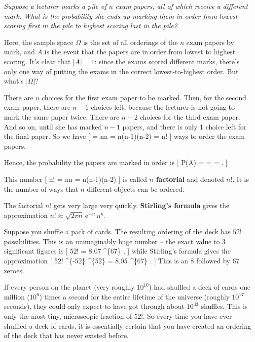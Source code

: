 \documentclass[
  letterpaper,
  DIV=11,
  numbers=noendperiod]{scrreprt}
\theoremstyle{remark}
\begin{document}
\emph{Suppose a lecturer marks a pile of \(n\) exam papers, all of which
receive a different mark. What is the probability she ends up marking
them in order from lowest scoring first in the pile to highest scoring
last in the pile?}

Here, the sample space \(\Omega\) is the set of all orderings of the
\(n\) exam papers by mark, and \(A\) is the event that the papers are in
order from lowest to highest scoring. It's clear that \(|A| = 1\): since
the exams scored different marks, there's only one way of putting the
exams in the correct lowest-to-highest order. But what's \(|\Omega|\)?

There are \(n\) choices for the first exam paper to be marked. Then, for
the second exam paper, there are \(n - 1\) choices left, because the
lecturer is not going to mark the same paper twice. There are \(n-2\)
choices for the third exam paper. And so on, until she has marked
\(n-1\) papers, and there is only 1 choice left for the final paper. So
we have {[} \textbar{}\Omega\textbar{} = \ff nn =
n(n-1)(n-2) = n! {]} ways to order the exam papers.

Hence, the probability the papers are marked in order is {[}
\mathbb P(A) =  =  =
 . {]}

This number {[} n! = \ff nn = n(n-1)(n-2) {]} is
called \textbf{\(n\) factorial} and denoted \(n!\). It is the number of
ways that \(n\) different objects can be ordered.

The factorial \(n!\) gets very large very quickly. \textbf{Stirling's
formula} gives the approximation
\(n! \approx \sqrt{2\pi n} \, \mathrm{e}^{-n} \, n^n\).

Suppose you shuffle a pack of cards. The resulting ordering of the deck
has \(52!\) possibilities. This is an unimaginably huge number -- the
exact value to 3 significant figures is {[} 52! = 8.07
\^{}\{67\} , {]} while Stirling's formula gives the
approximation {[} 52! \approx {}
\times {}\^{}\{-52\} \^{}\{52\} = 8.05
\^{}\{67\} . {]} This is an 8 followed by 67 zeroes.

If every person on the planet (very roughly \(10^{10}\)) had shuffled a
deck of cards one million (\(10^6\)) times a second for the entire
lifetime of the universe (roughly \(10^{17}\) seconds), they could only
expect to have got through about \(10^{33}\) shuffles. This is only the
most tiny, microscopic fraction of \(52!\). So every time you have ever
shuffled a deck of cards, it is essentially certain that you have
created an ordering of the deck that has never existed before.
\end{document}
